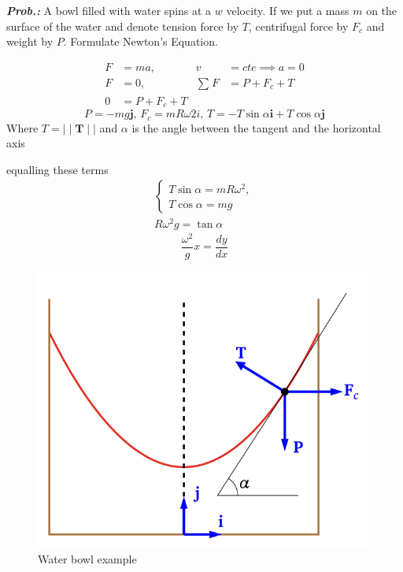 \documentclass[a4paper]{article}
\begin{document}
\textit{\textbf{Prob.:}} A bowl filled with water spins at a $w$ velocity. If we put a mass $m$ on the surface of the water and denote tension force by $T$, centrifugal force by $F_{c}$ and weight by $P$. Formulate Newton's Equation.

\begin{align}
F&=ma, & v&=cte\implies a=0 \\
F&=0, & \sum^{}_{}F&=P+F_{c}+T \\
0&= P+F_{c}+T
\end{align}
$$
P=-mg\mathbf{j},\, F_{c}=mR\omega 2i,\, T=-T\sin \alpha \mathbf{i} + T\cos \alpha \mathbf{j}
$$
Where $T=\mid\mid \mathbf{T}\mid\mid$ and $\alpha$ is the angle between the tangent and the horizontal axis

\begin{minipage}{0.4\textwidth}
equalling these terms
\begin{align}
\begin{cases}
T\sin \alpha=mR\omega^{2}, \\
T\cos \alpha=mg
\end{cases} \\
R\omega^{2}g=\tan \alpha
\end{align}
$$
\boxed{\frac{\omega^{2}}{g}x=\frac{dy}{dx}}
$$
\end{minipage} \hfill \begin{minipage}{0.4\linewidth}
\begin{figure}[H]
    \centering
    \includegraphics[width=\textwidth]{IMG/ex_water.png}
    \caption{Water bowl example}
    \label{fig:ex_water}
\end{figure}
\end{minipage}
\end{document}
